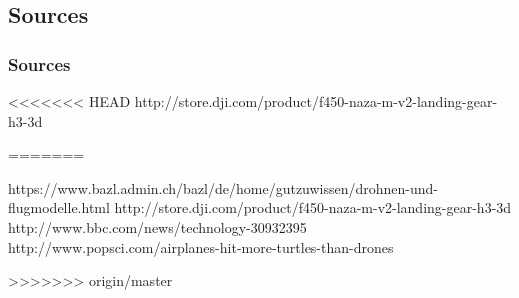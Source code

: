 \subsection{Sources}

\begin{frame}
\frametitle{Sources}

<<<<<<< HEAD
http://store.dji.com/product/f450-naza-m-v2-landing-gear-h3-3d


=======
\begin{small}
https://www.bazl.admin.ch/bazl/de/home/gutzuwissen/drohnen-und-flugmodelle.html
http://store.dji.com/product/f450-naza-m-v2-landing-gear-h3-3d
http://www.bbc.com/news/technology-30932395
http://www.popsci.com/airplanes-hit-more-turtles-than-drones


\end{small}

>>>>>>> origin/master
  
\end{frame}





